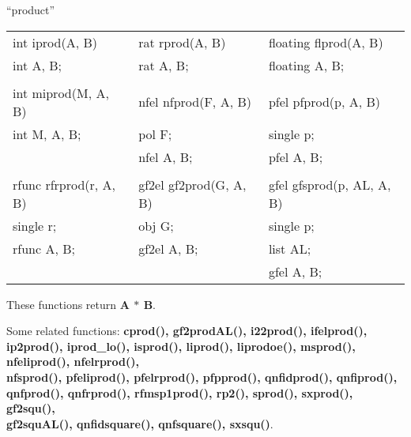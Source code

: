 \begin{center} ``product'' \end{center}
\begin{center}
{\bf
\begin{tabular}{lll}
int iprod(A, B) & rat rprod(A, B) & floating flprod(A, B)\\
int A, B;      & rat A, B;      & floating A, B;\\
&&\\
int miprod(M, A, B) & nfel nfprod(F, A, B) & pfel pfprod(p, A, B)\\
int M, A, B;       & pol F;              & single p;\\
                   & nfel A, B;          & pfel A, B;\\
&&\\
rfunc rfrprod(r, A, B) & gf2el gf2prod(G, A, B) & gfel gfsprod(p, AL, A, B)\\
single r;             & obj G;                & single p;\\
rfunc A, B;           & gf2el A, B;           & list AL;\\
                      &                       & gfel A, B;\\[1.5ex]
\end{tabular} }
\end{center}

These functions return {\bf A $*$ B}.

Some related functions:\hspace*{0.7em}
{\bf cprod(), gf2prodAL(), i22prod(), ifelprod(), ip2prod(), iprod\_lo(), isprod(),
liprod(), liprodoe(), msprod(), nfeliprod(), nfelrprod(), \\
nfsprod(), pfeliprod(), pfelrprod(),
pfpprod(), qnfidprod(), qnfiprod(), \\
qnfprod(), qnfrprod(), rfmsp1prod(), rp2(), sprod(),
sxprod(), gf2squ(), \\
gf2squAL(), qnfidsquare(), qnfsquare(), sxsqu()}.

\newpage

